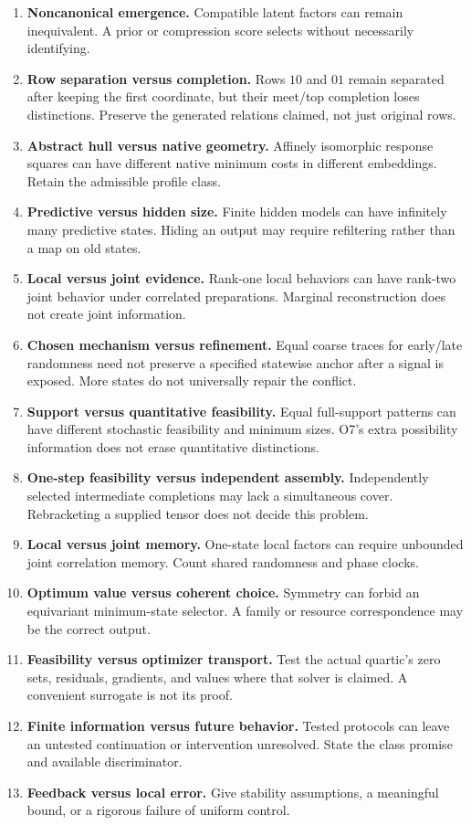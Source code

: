 \documentclass[11pt]{article}
\theoremstyle{definition}
\begin{document}
\begin{enumerate}
\item \textbf{Noncanonical emergence.} Compatible latent factors can remain inequivalent. A prior or compression score selects without necessarily identifying.
\item \textbf{Row separation versus completion.} Rows $10$ and $01$ remain separated after keeping the first coordinate, but their meet/top completion loses distinctions. Preserve the generated relations claimed, not just original rows.
\item \textbf{Abstract hull versus native geometry.} Affinely isomorphic response squares can have different native minimum costs in different embeddings. Retain the admissible profile class.
\item \textbf{Predictive versus hidden size.} Finite hidden models can have infinitely many predictive states. Hiding an output may require refiltering rather than a map on old states.
\item \textbf{Local versus joint evidence.} Rank-one local behaviors can have rank-two joint behavior under correlated preparations. Marginal reconstruction does not create joint information.
\item \textbf{Chosen mechanism versus refinement.} Equal coarse traces for early/late randomness need not preserve a specified statewise anchor after a signal is exposed. More states do not universally repair the conflict.
\item \textbf{Support versus quantitative feasibility.} Equal full-support patterns can have different stochastic feasibility and minimum sizes. O7's extra possibility information does not erase quantitative distinctions.
\item \textbf{One-step feasibility versus independent assembly.} Independently selected intermediate completions may lack a simultaneous cover. Rebracketing a supplied tensor does not decide this problem.
\item \textbf{Local versus joint memory.} One-state local factors can require unbounded joint correlation memory. Count shared randomness and phase clocks.
\item \textbf{Optimum value versus coherent choice.} Symmetry can forbid an equivariant minimum-state selector. A family or resource correspondence may be the correct output.
\item \textbf{Feasibility versus optimizer transport.} Test the actual quartic's zero sets, residuals, gradients, and values where that solver is claimed. A convenient surrogate is not its proof.
\item \textbf{Finite information versus future behavior.} Tested protocols can leave an untested continuation or intervention unresolved. State the class promise and available discriminator.
\item \textbf{Feedback versus local error.} Give stability assumptions, a meaningful bound, or a rigorous failure of uniform control.
\end{enumerate}
\end{document}
